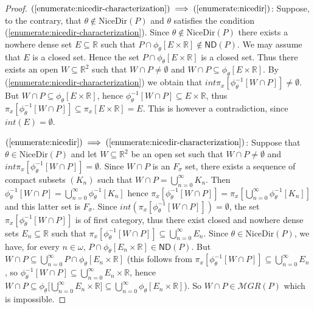 \documentclass[12pt]{amsart}
\theoremstyle{plain}
\theoremstyle{definition}
\theoremstyle{remark}
\newcommand{\meager}{{\mathcal MGR}}
\newcommand{\ND}{\mathsf{ND}}
\newcommand{\real}{\mathbb{R}}
\newcommand{\NICEDIRECTIONS}{\mathrm{NiceDir}}
\begin{document}
\begin{proof}
$(\ref{enumerate:nicedir-characterization}) \implies (\ref{enumerate:nicedir})$:
Suppose, to the contrary, that $\theta \not\in \NICEDIRECTIONS(P)$
and $\theta$ satisfies the condition (\ref{enumerate:nicedir-characterization}).
Since $\theta \not\in \NICEDIRECTIONS(P)$ there exists a nowhere dense set
$E \subseteq \real$ such that
$P \cap \phi_{\theta}[E \times \real] \not\in \ND(P)$.
We may assume that $E$ is a closed set. Hence the set
$P \cap \phi_{\theta}[E \times \real]$ is a closed set.
Thus there exists an open $W \subseteq \real^2$
such that $W \cap P \not= \emptyset$ and 
$W \cap P \subseteq \phi_{\theta}[E \times \real]$.
By (\ref{enumerate:nicedir-characterization}) we obtain
that $\mathit{int} \pi_x [\phi_\theta^{-1} [W \cap P]] \not= \emptyset$.
But $W \cap P \subseteq \phi_{\theta}[E \times \real]$, hence
$\phi_{\theta}^{-1}[W \cap P] \subseteq E \times \real$,
thus 
$\pi_x[\phi_{\theta}^{-1}[W \cap P]] \subseteq \pi_x[E \times \real] = E$.
This is however a contradiction, since $\mathit{int}(E) = \emptyset$.

$(\ref{enumerate:nicedir}) \implies (\ref{enumerate:nicedir-characterization})$:
Suppose that $\theta \in \NICEDIRECTIONS(P)$ and let $W \subseteq \real^2$
be an open set such that $W \cap P \not=\emptyset$ and
$\mathit{int} \pi_x [\phi_\theta^{-1} [W \cap P]] = \emptyset$.
Since $W \cap P$ is an $F_{\sigma}$ set,
there exists a sequence of compact subsets $(K_n)$ such that
$W \cap P = \bigcup_{n=0}^\infty K_n$. Then
$\phi^{-1}_\theta [W \cap P] = \bigcup_{n=0}^\infty \phi_\theta^{-1}[K_n]$ hence
$\pi_x[\phi^{-1}_\theta [W \cap P]] = \pi_x[\bigcup_{n=0}^\infty \phi_\theta^{-1}[K_n]]$
and this latter set is $F_{\sigma}$.
Since
$\mathit{int}(\pi_x[\phi^{-1}_\theta [W \cap P]])=\emptyset$, the set
$\pi_x[\phi^{-1}_\theta [W \cap P]]$
is of first category, thus
there exist closed and nowhere dense sets $E_n \subseteq \real$
such that 
$\pi_x[\phi^{-1}_\theta [W \cap P]] \subseteq \bigcup_{n=0}^\infty E_n$.
Since $\theta \in \NICEDIRECTIONS(P)$,
we have, for every $n\in\omega$, 
$P \cap \phi_{\theta}[E_n \times \real] \in \ND(P)$.
But
$W \cap P \subseteq \bigcup_{n=0}^\infty P \cap \phi_{\theta}[E_n \times \real]$
(this follows from 
$\pi_x[\phi^{-1}_\theta[W \cap P]] \subseteq \bigcup_{n=0}^\infty E_n$,
so
$\phi^{-1}_\theta[W \cap P] \subseteq \bigcup_{n=0}^\infty E_n \times \real$,
hence
$W \cap P \subseteq \phi_{\theta} \big[ \bigcup_{n=0}^\infty E_n \times \real \big]
\subseteq \bigcup_{n=0}^\infty \phi_{\theta}[E_n \times \real]$).
So $W \cap P \in \meager(P)$ which is impossible.
\end{proof}
\end{document}
